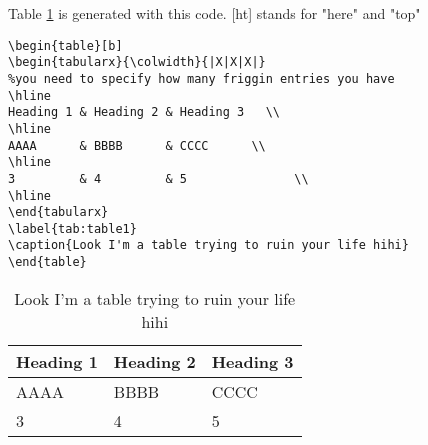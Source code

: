 \documentclass[twocolumn, serif]{jote-article}
\begin{document}
Table \ref{tab:table2} is generated with this code. [ht] stands for "here" and "top"
\begin{verbatim}
\begin{table}[b]
\begin{tabularx}{\colwidth}{|X|X|X|}
%you need to specify how many friggin entries you have
\hline
Heading 1 & Heading 2 & Heading 3   \\
\hline
AAAA      & BBBB      & CCCC      \\
\hline
3         & 4         & 5               \\
\hline
\end{tabularx}
\label{tab:table1}
\caption{Look I'm a table trying to ruin your life hihi}
\end{table}
\end{verbatim}


\begin{table}[b]
\begin{tabularx}{\linewidth}{|X|X|X|}
\hline
Heading 1 & Heading 2 & Heading 3   \\
\hline
AAAA      & BBBB      & CCCC      \\
\hline
3         & 4         & 5               \\
\hline
\end{tabularx}
\label{tab:table2}
\caption{Look I'm a table trying to ruin your life hihi}
\end{table}

\lipsum[1-4]


\nocite{*}

\setlength{\bibhang}{\parindent}

 {} 
\printbibliography
\end{document}
